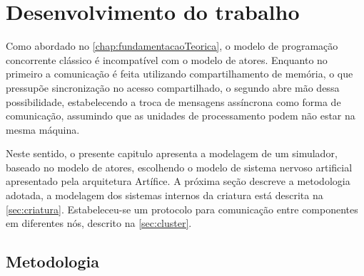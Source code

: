 
\chapter{Desenvolvimento do trabalho}
\label{chap:metodologia}

Como abordado no \autoref{chap:fundamentacaoTeorica}, o modelo de programação concorrente clássico é incompatível com o modelo de atores. Enquanto no primeiro a comunicação é feita utilizando compartilhamento de memória, o que pressupõe sincronização no acesso compartilhado, o segundo abre mão dessa possibilidade, estabelecendo a troca de mensagens assíncrona como forma de comunicação, assumindo que as unidades de processamento podem não estar na mesma máquina.

Neste sentido, o presente capitulo apresenta a modelagem de um simulador, baseado no modelo de atores, escolhendo o modelo de sistema nervoso artificial apresentado pela arquitetura Artífice. A próxima seção descreve a metodologia adotada, a modelagem dos sistemas internos da criatura está descrita na \autoref{sec:criatura}. Estabeleceu-se um protocolo para comunicação entre componentes em diferentes nós, descrito na \autoref{sec:cluster}. 

\section{Metodologia}
\label{sec:metodologia}

